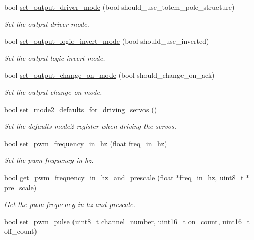 \begin{DoxyCompactItemize}
bool \hyperlink{class_p_c_a9685_ae1df0135d003eb1b184e1433f6b245e0}{set\+\_\+output\+\_\+driver\+\_\+mode} (bool should\+\_\+use\+\_\+totem\+\_\+pole\+\_\+structure)
\begin{DoxyCompactList}\small\item\em Set the output driver mode. \end{DoxyCompactList}\item 
bool \hyperlink{class_p_c_a9685_a28f27604b1b28f3c25e45125318b9867}{set\+\_\+output\+\_\+logic\+\_\+invert\+\_\+mode} (bool should\+\_\+use\+\_\+inverted)
\begin{DoxyCompactList}\small\item\em Set the output logic invert mode. \end{DoxyCompactList}\item 
bool \hyperlink{class_p_c_a9685_a067674fc92db60a2e72a91f94f98e8ce}{set\+\_\+output\+\_\+change\+\_\+on\+\_\+mode} (bool should\+\_\+change\+\_\+on\+\_\+ack)
\begin{DoxyCompactList}\small\item\em Set the output change on mode. \end{DoxyCompactList}\item 
bool \hyperlink{class_p_c_a9685_acf15c2c347bd44aa5fd33fd666e6e276}{set\+\_\+mode2\+\_\+defaults\+\_\+for\+\_\+driving\+\_\+servos} ()
\begin{DoxyCompactList}\small\item\em Set the defaults mode2 register when driving the servos. \end{DoxyCompactList}\item 
bool \hyperlink{class_p_c_a9685_a7743f9bd4a8a59d1ed4dd27498f25bf8}{set\+\_\+pwm\+\_\+frequency\+\_\+in\+\_\+hz} (float freq\+\_\+in\+\_\+hz)
\begin{DoxyCompactList}\small\item\em Set the pwm frequency in hz. \end{DoxyCompactList}\item 
bool \hyperlink{class_p_c_a9685_a2c205b32f73daced4b33c5cf7c5421ce}{get\+\_\+pwm\+\_\+frequency\+\_\+in\+\_\+hz\+\_\+and\+\_\+prescale} (float $\ast$freq\+\_\+in\+\_\+hz, uint8\+\_\+t $\ast$pre\+\_\+scale)
\begin{DoxyCompactList}\small\item\em Get the pwm frequency in hz and prescale. \end{DoxyCompactList}\item 
bool \hyperlink{class_p_c_a9685_a7c43c790dced7ac4f9b23217386f9897}{set\+\_\+pwm\+\_\+pulse} (uint8\+\_\+t channel\+\_\+number, uint16\+\_\+t on\+\_\+count, uint16\+\_\+t off\+\_\+count)

\end{DoxyCompactItemize}
